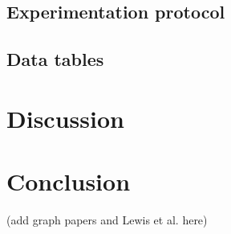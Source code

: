 \documentclass{scrartcl}
\begin{document}
\subsection{Experimentation protocol}

\subsection{Data tables}

\section{Discussion}

\section{Conclusion}



(add graph papers and Lewis et al. here)
\end{document}
